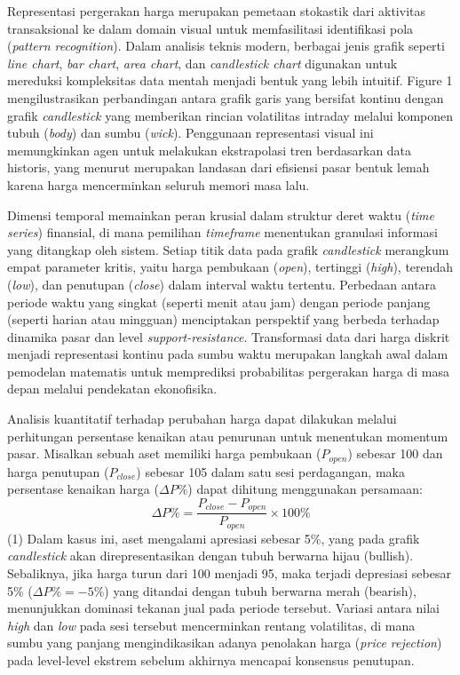 Representasi pergerakan harga merupakan pemetaan stokastik dari aktivitas transaksional ke dalam domain visual untuk memfasilitasi identifikasi pola (\textit{pattern recognition}). Dalam analisis teknis modern, berbagai jenis grafik seperti \textit{line chart}, \textit{bar chart}, \textit{area chart}, dan \textit{candlestick chart} digunakan untuk mereduksi kompleksitas data mentah menjadi bentuk yang lebih intuitif. Figure 1 mengilustrasikan perbandingan antara grafik garis yang bersifat kontinu dengan grafik \textit{candlestick} yang memberikan rincian volatilitas intraday melalui komponen tubuh (\textit{body}) dan sumbu (\textit{wick}). Penggunaan representasi visual ini memungkinkan agen untuk melakukan ekstrapolasi tren berdasarkan data historis, yang menurut \cite{fama_1970} merupakan landasan dari efisiensi pasar bentuk lemah karena harga mencerminkan seluruh memori masa lalu.

Dimensi temporal memainkan peran krusial dalam struktur deret waktu (\textit{time series}) finansial, di mana pemilihan \textit{timeframe} menentukan granulasi informasi yang ditangkap oleh sistem. Setiap titik data pada grafik \textit{candlestick} merangkum empat parameter kritis, yaitu harga pembukaan (\textit{open}), tertinggi (\textit{high}), terendah (\textit{low}), dan penutupan (\textit{close}) dalam interval waktu tertentu. Perbedaan antara periode waktu yang singkat (seperti menit atau jam) dengan periode panjang (seperti harian atau mingguan) menciptakan perspektif yang berbeda terhadap dinamika pasar dan level \textit{support-resistance}. Transformasi data dari harga diskrit menjadi representasi kontinu pada sumbu waktu merupakan langkah awal dalam pemodelan matematis untuk memprediksi probabilitas pergerakan harga di masa depan melalui pendekatan ekonofisika.

\begin{example}
    Analisis kuantitatif terhadap perubahan harga dapat dilakukan melalui perhitungan persentase kenaikan atau penurunan untuk menentukan momentum pasar. Misalkan sebuah aset memiliki harga pembukaan ($P_{open}$) sebesar 100 dan harga penutupan ($P_{close}$) sebesar 105 dalam satu sesi perdagangan, maka persentase kenaikan harga ($\Delta P\%$) dapat dihitung menggunakan persamaan:
    $$ \Delta P\% = \frac{P_{close} - P_{open}}{P_{open}} \times 100\% $$ (1)
    Dalam kasus ini, aset mengalami apresiasi sebesar 5\%, yang pada grafik \textit{candlestick} akan direpresentasikan dengan tubuh berwarna hijau (bullish). Sebaliknya, jika harga turun dari 100 menjadi 95, maka terjadi depresiasi sebesar 5\% ($\Delta P\% = -5\%$) yang ditandai dengan tubuh berwarna merah (bearish), menunjukkan dominasi tekanan jual pada periode tersebut. Variasi antara nilai \textit{high} dan \textit{low} pada sesi tersebut mencerminkan rentang volatilitas, di mana sumbu yang panjang mengindikasikan adanya penolakan harga (\textit{price rejection}) pada level-level ekstrem sebelum akhirnya mencapai konsensus penutupan.
\end{example}

